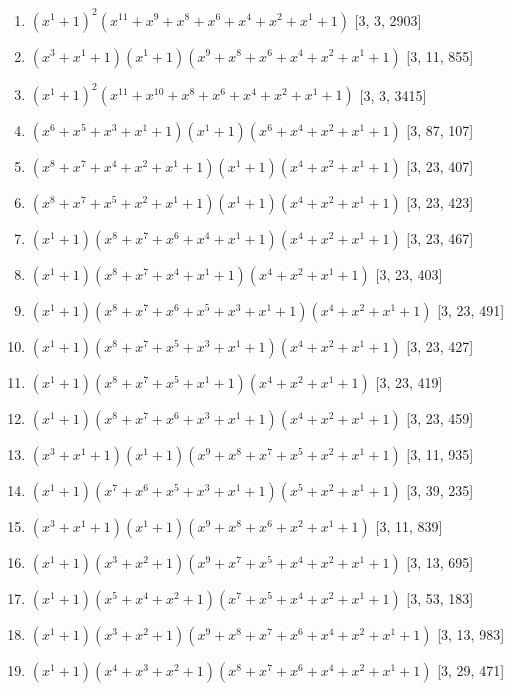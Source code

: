 \documentclass[10pt,twocolumn]{article}
\begin{document}
\begin{enumerate}
\item $(x^{1} + 1)^{2}(x^{11} + x^{9} + x^{8} + x^{6} + x^{4} + x^{2} + x^{1} + 1)$  [3, 3, 2903]
\item $(x^{3} + x^{1} + 1)(x^{1} + 1)(x^{9} + x^{8} + x^{6} + x^{4} + x^{2} + x^{1} + 1)$  [3, 11, 855]
\item $(x^{1} + 1)^{2}(x^{11} + x^{10} + x^{8} + x^{6} + x^{4} + x^{2} + x^{1} + 1)$  [3, 3, 3415]
\item $(x^{6} + x^{5} + x^{3} + x^{1} + 1)(x^{1} + 1)(x^{6} + x^{4} + x^{2} + x^{1} + 1)$  [3, 87, 107]
\item $(x^{8} + x^{7} + x^{4} + x^{2} + x^{1} + 1)(x^{1} + 1)(x^{4} + x^{2} + x^{1} + 1)$  [3, 23, 407]
\item $(x^{8} + x^{7} + x^{5} + x^{2} + x^{1} + 1)(x^{1} + 1)(x^{4} + x^{2} + x^{1} + 1)$  [3, 23, 423]
\item $(x^{1} + 1)(x^{8} + x^{7} + x^{6} + x^{4} + x^{1} + 1)(x^{4} + x^{2} + x^{1} + 1)$  [3, 23, 467]
\item $(x^{1} + 1)(x^{8} + x^{7} + x^{4} + x^{1} + 1)(x^{4} + x^{2} + x^{1} + 1)$  [3, 23, 403]
\item $(x^{1} + 1)(x^{8} + x^{7} + x^{6} + x^{5} + x^{3} + x^{1} + 1)(x^{4} + x^{2} + x^{1} + 1)$  [3, 23, 491]
\item $(x^{1} + 1)(x^{8} + x^{7} + x^{5} + x^{3} + x^{1} + 1)(x^{4} + x^{2} + x^{1} + 1)$  [3, 23, 427]
\item $(x^{1} + 1)(x^{8} + x^{7} + x^{5} + x^{1} + 1)(x^{4} + x^{2} + x^{1} + 1)$  [3, 23, 419]
\item $(x^{1} + 1)(x^{8} + x^{7} + x^{6} + x^{3} + x^{1} + 1)(x^{4} + x^{2} + x^{1} + 1)$  [3, 23, 459]
\item $(x^{3} + x^{1} + 1)(x^{1} + 1)(x^{9} + x^{8} + x^{7} + x^{5} + x^{2} + x^{1} + 1)$  [3, 11, 935]
\item $(x^{1} + 1)(x^{7} + x^{6} + x^{5} + x^{3} + x^{1} + 1)(x^{5} + x^{2} + x^{1} + 1)$  [3, 39, 235]
\item $(x^{3} + x^{1} + 1)(x^{1} + 1)(x^{9} + x^{8} + x^{6} + x^{2} + x^{1} + 1)$  [3, 11, 839]
\item $(x^{1} + 1)(x^{3} + x^{2} + 1)(x^{9} + x^{7} + x^{5} + x^{4} + x^{2} + x^{1} + 1)$  [3, 13, 695]
\item $(x^{1} + 1)(x^{5} + x^{4} + x^{2} + 1)(x^{7} + x^{5} + x^{4} + x^{2} + x^{1} + 1)$  [3, 53, 183]
\item $(x^{1} + 1)(x^{3} + x^{2} + 1)(x^{9} + x^{8} + x^{7} + x^{6} + x^{4} + x^{2} + x^{1} + 1)$  [3, 13, 983]
\item $(x^{1} + 1)(x^{4} + x^{3} + x^{2} + 1)(x^{8} + x^{7} + x^{6} + x^{4} + x^{2} + x^{1} + 1)$  [3, 29, 471]

\end{enumerate}
\end{document}
